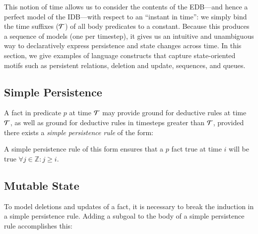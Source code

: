 This notion of time allows us to consider the contents of the EDB---and hence
a perfect model of the IDB---with respect to an ``instant in time'': we simply
bind the time suffixes ($\Tau$) of all body predicates to a constant.  Because
this produces a sequence of models (one per timestep), it gives us an intuitive
and unambiguous way to declaratively express persistence and state changes
across time.  In this section, we give examples of language constructs
that capture state-oriented motifs such as persistent relations,
deletion and update, sequences, and queues.

\subsection{Simple Persistence}
A fact in predicate $p$ at time $\Tau$ may provide ground for deductive rules
at time $\Tau$, as well as ground for deductive rules in timesteps greater than $\Tau$,
provided there exists a {\em simple persistence rule} of the form:


\noindent
A simple persistence rule of this form
ensures that a $p$ fact true at time $i$ will be true $\forall j \in \mathbb{Z} : j \ge i$.


\subsection{Mutable State}
\label{sec:mutable}

To model deletions and updates of a fact, it is necessary to break the induction
in a simple persistence rule.  Adding a  subgoal to the body of a
simple persistence rule accomplishes this:


